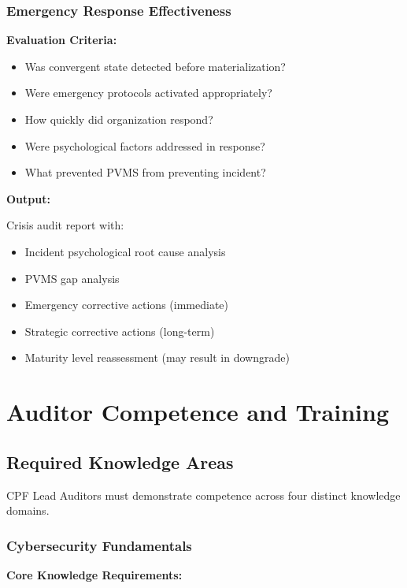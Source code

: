 \documentclass[11pt,a4paper]{article}
\begin{document}
\subsubsection{Emergency Response Effectiveness}

\textbf{Evaluation Criteria:}

\begin{itemize}
\item Was convergent state detected before materialization?
\item Were emergency protocols activated appropriately?
\item How quickly did organization respond?
\item Were psychological factors addressed in response?
\item What prevented PVMS from preventing incident?
\end{itemize}

\textbf{Output:}

Crisis audit report with:
\begin{itemize}
\item Incident psychological root cause analysis
\item PVMS gap analysis
\item Emergency corrective actions (immediate)
\item Strategic corrective actions (long-term)
\item Maturity level reassessment (may result in downgrade)
\end{itemize}

\section{Auditor Competence and Training}

\subsection{Required Knowledge Areas}

CPF Lead Auditors must demonstrate competence across four distinct knowledge domains.

\subsubsection{Cybersecurity Fundamentals}

\textbf{Core Knowledge Requirements:}
\end{document}
